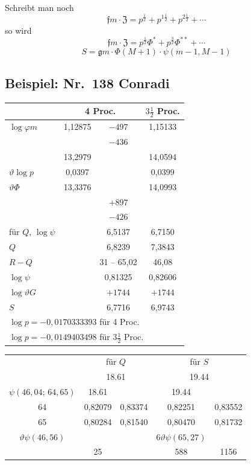 \documentclass[12pt,a4paper]{article}
\begin{document}
Schreibt man noch
\[
\mathfrak{f}m \cdot \mathfrak{Z} = p^{\frac{1}{2}} + p^{1\frac{1}{2}} + p^{2\frac{1}{2}} + \cdots
\]
so wird
\[
\mathfrak{f}m \cdot \mathfrak{Z} = p^{\frac{1}{2}}\Phi^* + p^{\frac{3}{2}}\Phi^{**} + \cdots
\]
\[
S = \mathfrak{g}m \cdot \Phi(M+1) \cdot \psi(m-1, M-1)
\]

\subsection*{Beispiel: Nr.~138 Conradi}

\begin{center}
\begin{tabular}{l|c|c|c}
 & \multicolumn{2}{c|}{4 Proc.} & $3\frac{1}{2}$ Proc. \\
\hline
$\log \varphi m$ & 1,12875 & $-497$ & 1,15133 \\
 & & $-436$ & \\
 & 13,2979 & & 14,0594 \\
$\vartheta\log p$ & 0,0397 & & 0,0399 \\
$\vartheta\Phi$ & 13,3376 & & 14,0993 \\
\hline
 & & $+897$ & \\
 & & $-426$ & \\
\hline
für $Q$, $\log \psi$ & & 6,5137 & 6,7150 \\
$Q$ & & 6,8239 & 7,3843 \\
$R-Q$ & & 31 -- 65,02 & 46,08 \\
\hline
$\log \psi$ & & 0,81325 & 0,82606 \\
$\log \vartheta G$ & & $+1744$ & $+1744$ \\
\hline
$S$ & & 6,7716 & 6,9743 \\
\hline
\multicolumn{4}{l}{$\log p = -0,0170333393$ \quad für 4 Proc.} \\
\multicolumn{4}{l}{$\log p = -0,0149403498$ \quad für $3\frac{1}{2}$ Proc.} \\
\end{tabular}
\end{center}

\begin{center}
\begin{tabular}{c|c|c|c|c}
 & \multicolumn{2}{c|}{für $Q$} & \multicolumn{2}{c}{für $S$} \\
 & \multicolumn{2}{c|}{18.61} & \multicolumn{2}{c}{19.44} \\
\hline
$\psi(46{,}04;\, 64{,}65)$ & 18.61 & & 19.44 & \\
64 & 0,82079 & 0,83374 & 0,82251 & 0,83552 \\
65 & 0,80284 & 0,81540 & 0,80470 & 0,81732 \\
\hline
$\vartheta\psi(46{,}56)$ & & & $6\vartheta\psi(65{,}27)$ & \\
 & 25 & & 588 & 1156 \\
\end{tabular}
\end{center}
\end{document}
